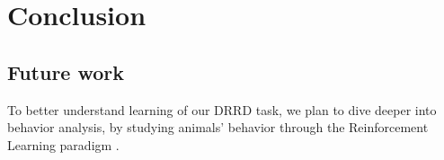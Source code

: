 
\chapter{Conclusion}
\label{chap:conclusion}


\section{Future work}
\label{sec:future}

To better understand learning of our DRRD task, we plan to dive deeper into behavior analysis, by studying animals' behavior through the Reinforcement Learning paradigm \cite{niv2016reinforcement}.